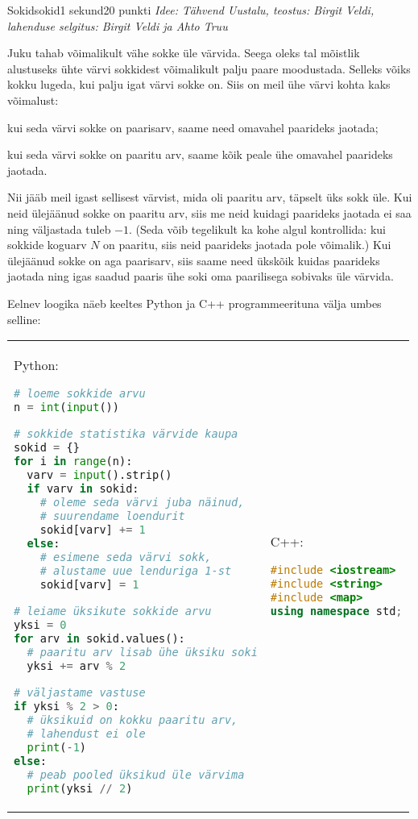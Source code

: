 \begin{yl}{2}{Sokid}{sokid}{1 sekund}{20 punkti}
  \emph{Idee: Tähvend Uustalu, teostus: Birgit Veldi, lahenduse selgitus: Birgit Veldi ja Ahto Truu}

  Juku tahab võimalikult vähe sokke üle värvida. Seega oleks tal mõistlik alustuseks ühte värvi sokkidest võimalikult palju paare moodustada. 
  Selleks võiks kokku lugeda, kui palju igat värvi sokke on. Siis on meil ühe värvi kohta kaks võimalust: 
  \begin{xitem}
    \item kui seda värvi sokke on paarisarv, saame need omavahel paarideks jaotada;
    \item kui seda värvi sokke on paaritu arv, saame kõik peale ühe omavahel paarideks jaotada.
  \end{xitem}
  Nii jääb meil igast sellisest värvist, mida oli paaritu arv, täpselt üks sokk üle.
  Kui neid ülejäänud sokke on paaritu arv, siis me neid kuidagi paarideks jaotada ei saa ning väljastada tuleb $-1$. (Seda võib tegelikult ka kohe algul kontrollida: kui sokkide koguarv $N$ on paaritu, siis neid paarideks jaotada pole võimalik.)
  Kui ülejäänud sokke on aga paarisarv, siis saame need ükskõik kuidas paarideks jaotada ning igas saadud paaris ühe soki oma paarilisega sobivaks üle värvida.

  Eelnev loogika näeb keeltes Python ja C++ programmeerituna välja umbes selline:

\begin{tabular}{p{\colwidth} p{\colwidth}}
Python:
\begin{lstlisting}[language=Python]
# loeme sokkide arvu
n = int(input())

# sokkide statistika värvide kaupa
sokid = {}
for i in range(n):
  varv = input().strip()
  if varv in sokid:
    # oleme seda värvi juba näinud,
    # suurendame loendurit
    sokid[varv] += 1
  else:
    # esimene seda värvi sokk,
    # alustame uue lenduriga 1-st
    sokid[varv] = 1

# leiame üksikute sokkide arvu 
yksi = 0
for arv in sokid.values():
  # paaritu arv lisab ühe üksiku soki
  yksi += arv % 2

# väljastame vastuse
if yksi % 2 > 0:
  # üksikuid on kokku paaritu arv,
  # lahendust ei ole
  print(-1)
else: 
  # peab pooled üksikud üle värvima
  print(yksi // 2)
\end{lstlisting}
&
C++:
\begin{lstlisting}[language=C++]
#include <iostream>
#include <string>
#include <map>
using namespace std;


\end{lstlisting}
\end{tabular}
\end{yl}
